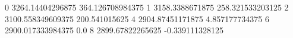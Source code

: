 0 3264.14404296875 364.126708984375
1 3158.3388671875 258.321533203125
2 3100.558349609375 200.541015625
4 2904.87451171875 4.857177734375
6 2900.017333984375 0.0
8 2899.67822265625 -0.339111328125

